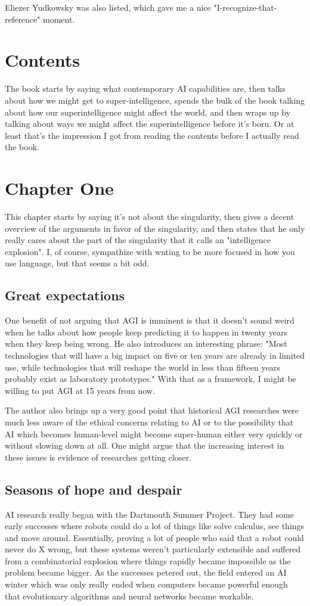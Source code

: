 \documentclass{scrartcl}
\begin{document}
Eliezer Yudkowsky was also listed, which gave me a nice "I-recognize-that-reference" moment.
\section*{Contents}
The book starts by saying what contemporary AI capabilities are, then talks about how we might get to super-intelligence,
spends the bulk of the book talking about how our superintelligence might affect the world, and then wraps up by
talking about ways we might affect the superintelligence before it's born. Or at least that's the impression I got from
reading the contents before I actually read the book.
\section*{Chapter One}
This chapter starts by saying it's not about the singularity, then gives a decent overview of the arguments in favor
of the singularity, and then states that he only really cares about the part of the singularity that it calls an "intelligence explosion".
I, of course, sympathize with wnting to be more focused in how you use language, but that seems a bit odd.
\subsection*{Great expectations}
One benefit of not arguing that AGI is imminent is that it doesn't sound weird when he talks about how people keep predicting
it to happen in twenty years when they keep being wrong. He also introduces an interesting phrase: "Most technologies that
will have a big impact on five or ten years are already in limited use, while technologies that will reshape the world in less than
fifteen years probably exist as laboratory prototypes." With that as a framework, I might be willing to put AGI at 15 years from
now. %

The author also brings up a very good point that historical AGI researches were much less aware of the ethical concerns
relating to AI or to the possibility that AI which becomes human-level might become super-human either very quickly or
without slowing down at all. One might argue that the increasing interest in these issues is evidence of researches getting
closer.
\subsection*{Seasons of hope and despair}
AI research really began with the Dartmouth Summer Project. They had some early successes where robots could do
a lot of things like solve calculus, see things and move around. Essentially, proving a lot of people who said that a robot
could never do X wrong, but these systems weren't particularly extensible and suffered from a combinatorial explosion where
things rapidly became impossible as the problem became bigger. As the successes petered out, the field entered an AI winter
which was only really ended when computers became powerful enough that evolutionary algorithms and neural networks
became workable.
\end{document}
